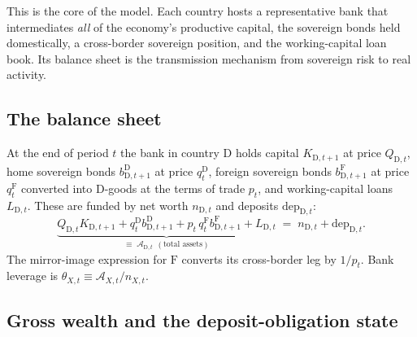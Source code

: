 \documentclass[11pt]{article}
\numberwithin{equation}{section}
\newcommand{\D}{\mathrm{D}}
\newcommand{\F}{\mathrm{F}}
\theoremstyle{definition}
\theoremstyle{plain}
\theoremstyle{remark}
\begin{document}
This is the core of the model. Each country hosts a representative bank that
intermediates \emph{all} of the economy's productive capital, the sovereign bonds
held domestically, a cross-border sovereign position, and the working-capital loan
book. Its balance sheet is the transmission mechanism from sovereign risk to real
activity.

\subsection{The balance sheet}

At the end of period $t$ the bank in country $\D$ holds capital $K_{\D,t+1}$ at
price $Q_{\D,t}$, home sovereign bonds $b^{\D}_{\D,t+1}$ at price $q^{\D}_t$,
foreign sovereign bonds $b^{\F}_{\D,t+1}$ at price $q^{\F}_t$ converted into
$\D$-goods at the terms of trade $p_t$, and working-capital loans $L_{\D,t}$. These
are funded by net worth $n_{\D,t}$ and deposits $\mathrm{dep}_{\D,t}$:
\begin{equation}
\underbrace{Q_{\D,t}K_{\D,t+1}
   +q^{\D}_{t}b^{\D}_{\D,t+1}
   +p_t\,q^{\F}_{t}b^{\F}_{\D,t+1}
   +L_{\D,t}}_{\textstyle \equiv\;\mathcal{A}_{\D,t}\ \ (\text{total assets})}
\;=\;n_{\D,t}+\mathrm{dep}_{\D,t}.
\label{eq:balance-sheet}
\end{equation}
The mirror-image expression for $\F$ converts its cross-border leg by $1/p_t$. Bank
leverage is $\theta_{X,t}\equiv\mathcal{A}_{X,t}/n_{X,t}$.

\subsection{Gross wealth and the deposit-obligation state}
\end{document}
